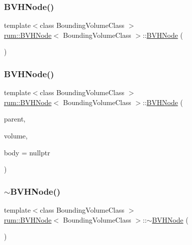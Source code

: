 \subsubsection{\texorpdfstring{B\+V\+H\+Node()}{BVHNode()}\hspace{0.1cm}{\footnotesize\ttfamily [1/2]}}
{\footnotesize\ttfamily template$<$class Bounding\+Volume\+Class $>$ \\
\hyperlink{classrum_1_1_b_v_h_node}{rum\+::\+B\+V\+H\+Node}$<$ Bounding\+Volume\+Class $>$\+::\hyperlink{classrum_1_1_b_v_h_node}{B\+V\+H\+Node} (\begin{DoxyParamCaption}{ }\end{DoxyParamCaption})}

\mbox{\label{classrum_1_1_b_v_h_node_a4d6bef35007d6473eefe2ce8979e2e2c}} 
\subsubsection{\texorpdfstring{B\+V\+H\+Node()}{BVHNode()}\hspace{0.1cm}{\footnotesize\ttfamily [2/2]}}
{\footnotesize\ttfamily template$<$class Bounding\+Volume\+Class $>$ \\
\hyperlink{classrum_1_1_b_v_h_node}{rum\+::\+B\+V\+H\+Node}$<$ Bounding\+Volume\+Class $>$\+::\hyperlink{classrum_1_1_b_v_h_node}{B\+V\+H\+Node} (\begin{DoxyParamCaption}\item[{\hyperlink{classrum_1_1_b_v_h_node}{B\+V\+H\+Node}$<$ Bounding\+Volume\+Class $>$ $\ast$}]{parent,  }\item[{const Bounding\+Volume\+Class \&}]{volume,  }\item[{\hyperlink{classrum_1_1_rigid_body}{Rigid\+Body} $\ast$}]{body = {\ttfamily nullptr} }\end{DoxyParamCaption})}

\mbox{\label{classrum_1_1_b_v_h_node_a97283b0dd8f0cf52762da014a94ade0b}} 
\subsubsection{\texorpdfstring{$\sim$\+B\+V\+H\+Node()}{~BVHNode()}}
{\footnotesize\ttfamily template$<$class Bounding\+Volume\+Class $>$ \\
\hyperlink{classrum_1_1_b_v_h_node}{rum\+::\+B\+V\+H\+Node}$<$ Bounding\+Volume\+Class $>$\+::$\sim$\hyperlink{classrum_1_1_b_v_h_node}{B\+V\+H\+Node} (\begin{DoxyParamCaption}{ }\end{DoxyParamCaption})}



